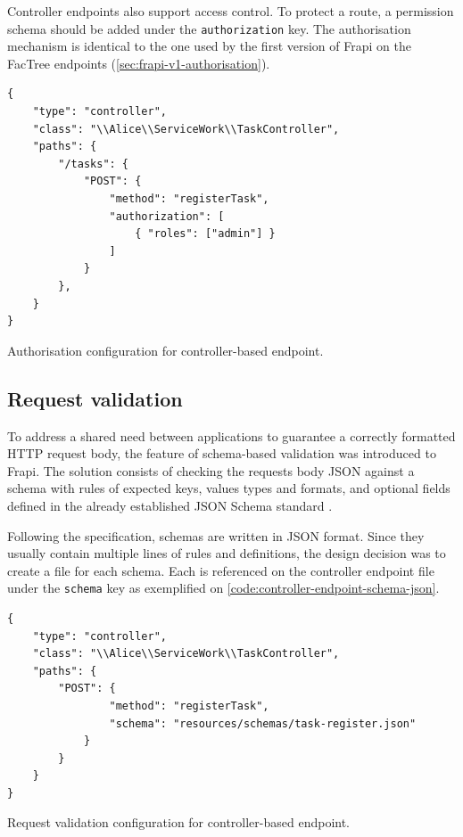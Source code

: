 Controller endpoints also support access control. To protect a route, a permission schema should be added under the \texttt{authorization} key. The authorisation mechanism is identical to the one used by the first version of Frapi on the FacTree endpoints (\autoref{sec:frapi-v1-authorisation}).

\begin{listing}[htbp]
\begin{verbatim}
{
    "type": "controller",
    "class": "\\Alice\\ServiceWork\\TaskController",
    "paths": {
        "/tasks": {
            "POST": {
	            "method": "registerTask",
	            "authorization": [
                    { "roles": ["admin"] }
                ]
	        }
        },
    }
}
\end{verbatim}
\caption{Authorisation configuration for controller-based endpoint.}
\label{code:controller-endpoint-auth-json}
\end{listing}

\subsection{Request validation}

To address a shared need between applications to guarantee a correctly formatted HTTP request body, the feature of schema-based validation was introduced to Frapi. The solution consists of checking the requests body JSON against a schema with rules of expected keys, values types and formats, and optional fields defined in the already established JSON Schema standard \cite{json-schema-spec}.

Following the specification, schemas are written in JSON format. Since they usually contain multiple lines of rules and definitions, the design decision was to create a file for each schema. Each is referenced on the controller endpoint file under the \texttt{schema} key as exemplified on \autoref{code:controller-endpoint-schema-json}.

\begin{listing}[htbp]
\begin{verbatim}
{
	"type": "controller",
    "class": "\\Alice\\ServiceWork\\TaskController",
    "paths": {
		"POST": {
                "method": "registerTask",
                "schema": "resources/schemas/task-register.json"
            }
        }
    }
}
\end{verbatim}
\caption{Request validation configuration for controller-based endpoint.}
\label{code:controller-endpoint-schema-json}
\end{listing}

